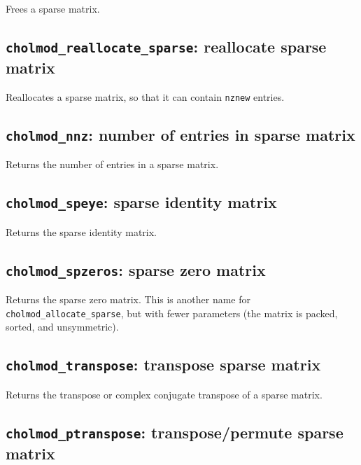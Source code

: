 \documentclass[11pt]{article}
\begin{document}

Frees a sparse matrix.

\subsection{{\tt cholmod\_reallocate\_sparse}: reallocate sparse matrix}


Reallocates a sparse matrix, so that it can contain {\tt nznew} entries.

\subsection{{\tt cholmod\_nnz}: number of entries in sparse matrix}


Returns the number of entries in a sparse matrix.

\subsection{{\tt cholmod\_speye}: sparse identity matrix}


Returns the sparse identity matrix.

\subsection{{\tt cholmod\_spzeros}: sparse zero matrix}


Returns the sparse zero matrix.  This is another name
for {\tt cholmod\_allocate\_sparse}, but with fewer parameters
(the matrix is packed, sorted, and unsymmetric).

\newpage \subsection{{\tt cholmod\_transpose}: transpose sparse matrix}


Returns the transpose or complex conjugate transpose of a sparse matrix.

\subsection{{\tt cholmod\_ptranspose}: transpose/permute sparse matrix}
\end{document}
